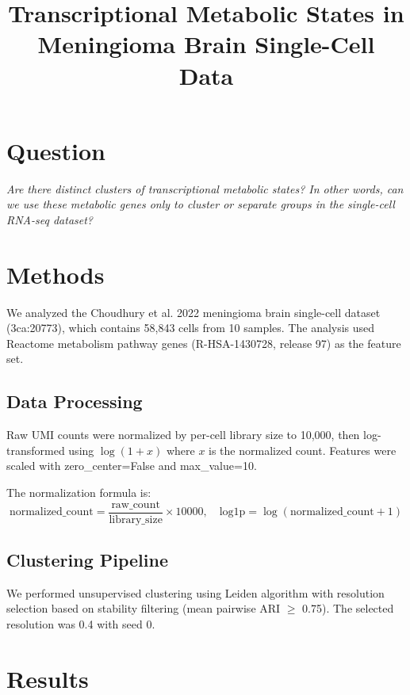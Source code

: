 \documentclass[11pt,a4paper]{article}
\title{\textbf{Transcriptional Metabolic States in Meningioma Brain Single-Cell Data}}
\author{}
\date{}
\begin{document}
\maketitle

\section{Question}
\textit{Are there distinct clusters of transcriptional metabolic states? In other words, can we use these metabolic genes only to cluster or separate groups in the single-cell RNA-seq dataset?}

\section{Methods}
We analyzed the Choudhury et al. 2022 meningioma brain single-cell dataset (3ca:20773), which contains 58,843 cells from 10 samples. The analysis used Reactome metabolism pathway genes (R-HSA-1430728, release 97) as the feature set.

\subsection{Data Processing}
Raw UMI counts were normalized by per-cell library size to 10,000, then log-transformed using $\log(1+x)$ where $x$ is the normalized count. Features were scaled with zero\_center=False and max\_value=10.

The normalization formula is:
\begin{equation}
\text{normalized\_count} = \frac{\text{raw\_count}}{\text{library\_size}} \times 10000, \quad \text{log1p} = \log(\text{normalized\_count} + 1)
\end{equation}

\subsection{Clustering Pipeline}
We performed unsupervised clustering using Leiden algorithm with resolution selection based on stability filtering (mean pairwise ARI $\ge$ 0.75). The selected resolution was 0.4 with seed 0.

\section{Results}
\end{document}

